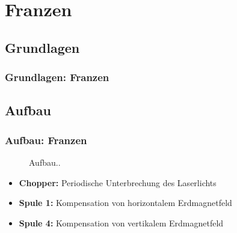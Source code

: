 
\section{Franzen}
\subsection{Grundlagen}
\begin{frame}
\frametitle{Grundlagen: Franzen}
  
\end{frame}

\subsection{Aufbau}
\begin{frame}
\frametitle{Aufbau: Franzen}

\begin{figure}
    \centering
    \def\svgwidth{\textwidth}
    
    \caption{Aufbau..}
\end{figure}

\begin{itemize}
  \item \textbf{Chopper:} Periodische Unterbrechung des Laserlichts
  \item \textbf{Spule 1:} Kompensation von horizontalem Erdmagnetfeld
  \item \textbf{Spule 4:} Kompensation von vertikalem Erdmagnetfeld
\end{itemize}

\end{frame}

